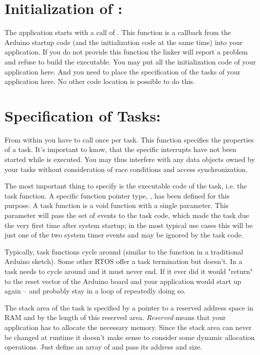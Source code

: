 \section{Initialization of \rtos: }

The \rtos{} application starts with a call of . This function
is a callback from the Arduino startup code (and the \rtos{} initialization
code at the same time) into your application. If you do not provide this
function the linker will report a problem and refuse to build the
executable. You may put all the initialization code of your application
here. And you need to place the specification of the tasks of your
application here. No other code location is possible to do this.


\section{Specification of Tasks: }

From within  you have to call 
once per task. This function specifies the properties of a task. It's
important to know, that the specific \rtos{} interrupts have not been
started while  is executed. You may thus interfere with any
data objects owned by your tasks without consideration of race conditions
and access synchronization.

The most important thing to specify is the executable code of the task,
i.e. the task function. A specific function pointer type,
, has been defined for this purpose. A
task function is a void function with a single parameter. This parameter
will pass the set of events to the task code, which made the task due the
very first time after system startup; in the most typical use cases this
will be just one of the two system timer events and may be ignored by the
task code.

Typically, task functions cycle around (similar to the function
 in a traditional Arduino sketch). Some other RTOS offer a
task termination but \rtos{} doesn't. In \rtos{} a task needs to cycle
around and it must never end. If it ever did it would "return" to the reset
vector of the Arduino board and your application would start up again --
and probably stay in a loop of repeatedly doing so.

The stack area of the task is specified by a pointer to a reserved address
space in RAM and by the length of this reserved area. \emph{Reserved} means
that your application has to allocate the necessary memory. Since the
stack area can never be changed at runtime it doesn't make sense to
consider some dynamic allocation operations. Just define an array of
 and pass its address and size.

